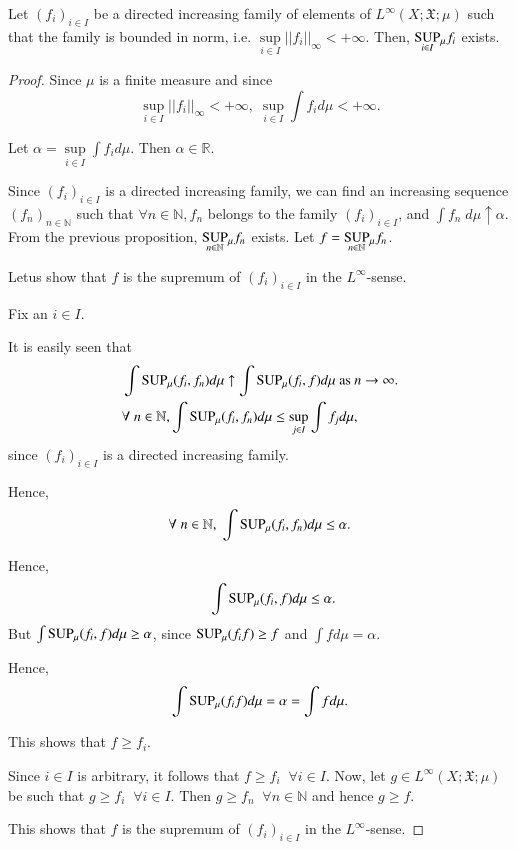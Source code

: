 \begin{proposition}\label{part1:chap3:prop27}
Let $(f_i)_{i \in I}$ be a directed increasing family of elements of
$L^\infty (X; \mathfrak{X}; \mu)$ such that the family is bounded in
norm, i.e. $\sup\limits_{i \in I}||f_i||_\infty < + \infty$. Then,
$\underset{i \in I}{\operatorname{SUP}}{}_\mu f_i$  exists. 
\end{proposition}

\begin{proof}
Since $\mu $ is a finite measure and since
$$
\sup\limits_{i \in I}||f_i||_\infty < + \infty, \; \sup\limits_{i \in
  I} \int f_i d\mu < + \infty. 
$$

Let $\alpha = \sup\limits_{i \in I} \int f_i d\mu$. Then $\alpha \in
\mathbb{R}$. 

Since $(f_i)_{i \in I}$ is a directed increasing family, we can find
an increasing sequence $(f_n)_{n \in \mathbb{N}}$ such that $\forall n
\in \mathbb{N}, f_n$ belongs to the family $(f_i)_{i \in I}$, and
$\int f_n \; d\mu \uparrow \alpha$. From the previous proposition,
$\underset{n \in \mathbb{N}}{\operatorname{SUP}} {}_\mu f_n$ exists. Let $f =
\underset{n \in \mathbb{N}}{\operatorname{SUP}}{}_\mu f_n$. 

Let\pageoriginale us show that $f$ is the supremum of $(f_i)_{i \in
  I}$ in the $L^\infty$-sense. 

Fix an $i \in I$. 

It is easily seen that 
\begin{align*}
& \int \operatorname{SUP}_\mu (f_i, f_n) d \mu \uparrow \int \operatorname{SUP}_\mu (f_i, f) d \mu
  \text{ as  } n \to \infty. \\
& \forall\; n \in \mathbb{N}, \int \operatorname{SUP}_\mu (f_i , f_n) d \mu
  \leq\sup\limits_{j \in I} \int f_jd \mu, 
\end{align*}
since $(f_i)_{i \in I}$ is a directed increasing family.

Hence, 
$$
\forall \; n \in\mathbb{N}, \; \int \operatorname{SUP}_\mu(f_i, f_n) d \mu \leq
\alpha. 
$$

Hence, 
$$
\qquad \int \operatorname{SUP}_\mu(f_i, f) d \mu \leq \alpha. 
$$
But $\int\operatorname{SUP}_\mu (f_i, f) d \mu \geq \alpha$, since $\operatorname{SUP}_\mu (f_i f)
\geq f$ and $\int f d \mu = \alpha$. 

Hence, 
$$
\int\operatorname{SUP}_\mu (f_i f) d \mu = \alpha = \int f d \mu. 
$$

This shows that $f \geq f_i$. 

Since $i \in I$ is arbitrary, it follows that $f \geq f_i \;\; \forall i
\in I$. Now, let $g \in L^\infty (X; \mathfrak{X}; \mu)$ be such that
$g \geq f_i \;\; \forall i \in I$. Then $g \geq f_n \;\; \forall n \in
\mathbb{N}$ and hence $g \geq f$. 

This shows that $f$ is the supremum of $(f_i)_{i \in I}$ in the
$L^\infty$-sense. 
\end{proof}

